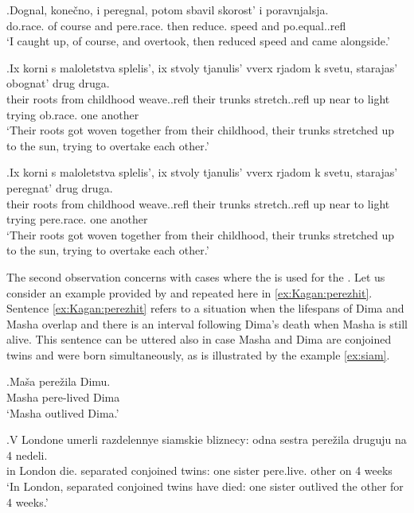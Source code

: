 \exg.\label{ex:comparison:peregnat}Dognal, kone\v{c}no, i peregnal, potom sbavil skorost' i poravnjalsja.\\
do.race. {of course} and pere.race. then reduce. speed and po.equal..refl\\
\trans `I caught up, of course, and overtook, then reduced speed and came alongside.' 

\exg.\label{ex:comparison:obognat}Ix korni s maloletstva splelis', ix stvoly tjanulis' vverx rjadom k svetu, starajas' obognat' drug druga.\\
their roots from childhood weave..refl their trunks stretch..refl up near to light trying ob.race. one another\\
\trans `Their roots got woven together from their childhood, their trunks stretch\-ed up to the sun, trying to overtake each other.'\\

\exg.\label{ex:peregnat}Ix korni s maloletstva splelis', ix stvoly tjanulis' vverx rjadom k svetu, starajas' peregnat' drug druga.\\
their roots from childhood weave..refl their trunks stretch..refl up near to light trying pere.race. one another\\
\trans `Their roots got woven together from their childhood, their trunks stretch\-ed up to the sun, trying to overtake each other.'

The second observation concerns with cases where the  is used for the . Let us consider an example provided by \citet[142]{Kagan:book} and repeated here in \ref{ex:Kagan:perezhit}. Sentence \ref{ex:Kagan:perezhit} refers to a situation when the lifespans of Dima and Masha overlap and there is an interval following Dima's death when Masha is still alive. This sentence can be uttered also in case Masha and Dima are conjoined twins and were born simultaneously, as is illustrated by the example \ref{ex:siam}.

\exg.\label{ex:Kagan:perezhit}Ma\v{s}a pere\v{z}ila Dimu.\\
Masha pere-lived Dima\\
\trans `Masha outlived Dima.'

\exg.\label{ex:siam}V Londone umerli razdelennye siamskie bliznecy: odna sestra pere\v{z}ila druguju na 4 nedeli.\\
in London die. separated conjoined twins: one sister pere.live. other on 4 weeks\\
\trans `In London, separated conjoined twins have died: one sister outlived the other for 4 weeks.'

